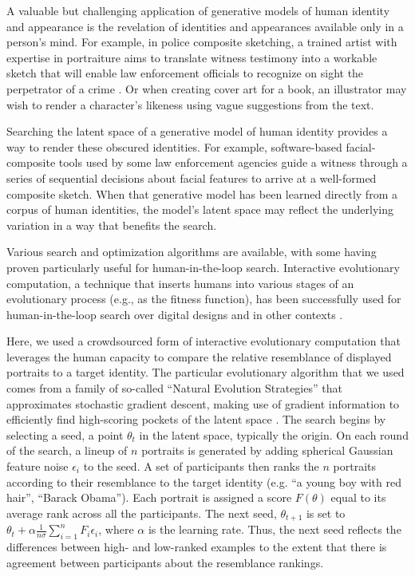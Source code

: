 \documentclass[10pt,letterpaper]{article}
\begin{document}
A valuable but challenging application of generative models of human identity and appearance is the revelation of identities and appearances available only in a person's mind. For example, in police composite sketching, a trained artist with expertise in portraiture aims to translate witness testimony into a workable sketch that will enable law enforcement officials to recognize on sight the perpetrator of a crime  \citep{mancusi2010police}. Or when creating cover art for a book, an illustrator may wish to render a character's likeness using vague suggestions from the text.

Searching the latent space of a generative model of human identity provides a way to render these obscured identities. For example, software-based facial-composite tools used by some law enforcement agencies guide a witness through a series of sequential decisions about facial features to arrive at a well-formed composite sketch. When that generative model has been learned directly from a corpus of human identities, the model's latent space may reflect the underlying variation in a way that benefits the search. 

Various search and optimization algorithms are available, with some having proven particularly useful for human-in-the-loop search. Interactive evolutionary computation, a technique that inserts humans into various stages of an evolutionary process (e.g., as the fitness function), has been successfully used for human-in-the-loop search over digital designs and in other contexts \citep{takagi2001interactive}.

Here, we used a crowdsourced form of interactive evolutionary computation that leverages the human capacity to compare the relative resemblance of displayed portraits to a target identity. The particular evolutionary algorithm that we used comes from a family of so-called ``Natural Evolution Strategies'' that approximates stochastic gradient descent, making use of gradient information to efficiently find high-scoring pockets of the latent space \citep{spall1992multivariate}. The search begins by selecting a seed, a point $\theta_t$ in the latent space, typically the origin. On each round of the search, a lineup of $n$ portraits is generated by adding spherical Gaussian feature noise $\epsilon_{i}$ to the seed. A set of participants then ranks the $n$ portraits according to their resemblance to the target identity (e.g. ``a young boy with red hair'', ``Barack Obama''). Each portrait is assigned a score $F(\theta)$ equal to its average rank across all the participants. The next seed, $\theta_{t+1}$ is set to $\theta_t + \alpha \frac{1}{n\sigma}\sum_{i=1}^{n}F_{i}\epsilon_{i}$, where $\alpha$ is the learning rate. Thus, the next seed reflects the differences between high- and low-ranked examples to the extent that there is agreement between participants about the resemblance rankings.
\end{document}
